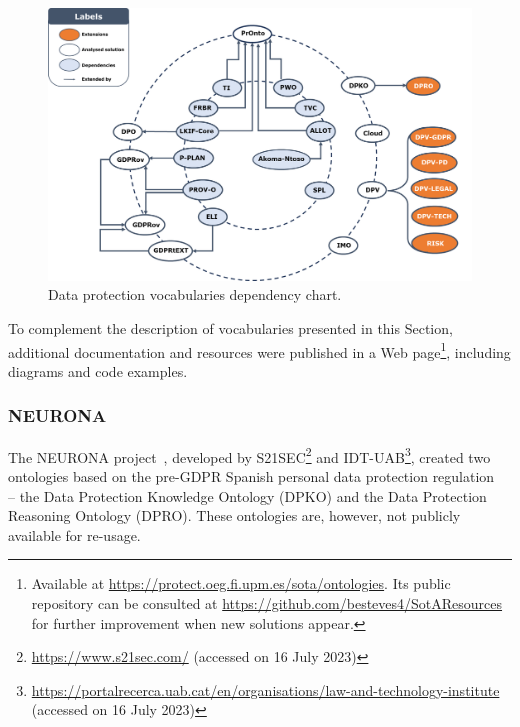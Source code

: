 \begin{figure}[ht]
\caption{Data protection vocabularies dependency chart.}
\label{fig:voc_dependency_graph}
\centering
\includegraphics[width=\textwidth]{figures/chapter-2/vocabs.png}
\end{figure}

To complement the description of vocabularies presented in this Section, additional documentation and resources were published in a Web page\footnote{Available at \url{https://protect.oeg.fi.upm.es/sota/ontologies}. Its public repository can be consulted at \url{https://github.com/besteves4/SotAResources} for further improvement when new solutions appear.}, including diagrams and code examples.

\subsubsection{NEURONA}
\label{sec:neurona}

The NEURONA project~\citep{casellas_ontological_2010}, developed by S21SEC\footnote{\url{https://www.s21sec.com/} (accessed on 16 July 2023)} and IDT-UAB\footnote{\url{https://portalrecerca.uab.cat/en/organisations/law-and-technology-institute} (accessed on 16 July 2023)}, created two ontologies based on the pre-GDPR Spanish personal data protection regulation~\citeyearpar{noauthor_real_2008} -- the Data Protection Knowledge Ontology (DPKO) and the Data Protection Reasoning Ontology (DPRO).
These ontologies are, however, not publicly available for re-usage.

